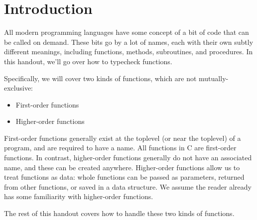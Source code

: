 \section{Introduction}
All modern programming languages have some concept of a bit of code that can be called on demand.
These bits go by a lot of names, each with their own subtly different meanings, including functions, methods, subroutines, and procedures.
In this handout, we'll go over how to typecheck functions.

Specifically, we will cover two kinds of functions, which are not mutually-exclusive:
\begin{itemize}
\item First-order functions
\item Higher-order functions
\end{itemize}

\noindent
First-order functions generally exist at the toplevel (or near the toplevel) of a program, and are required to have a name.
All functions in C are first-order functions.
In contrast, higher-order functions generally do not have an associated name, and these can be created anywhere.
Higher-order functions allow us to treat functions as data: whole functions can be passed as parameters, returned from other functions, or saved in a data structure.
We assume the reader already has some familiarity with higher-order functions.

The rest of this handout covers how to handle these two kinds of functions.
